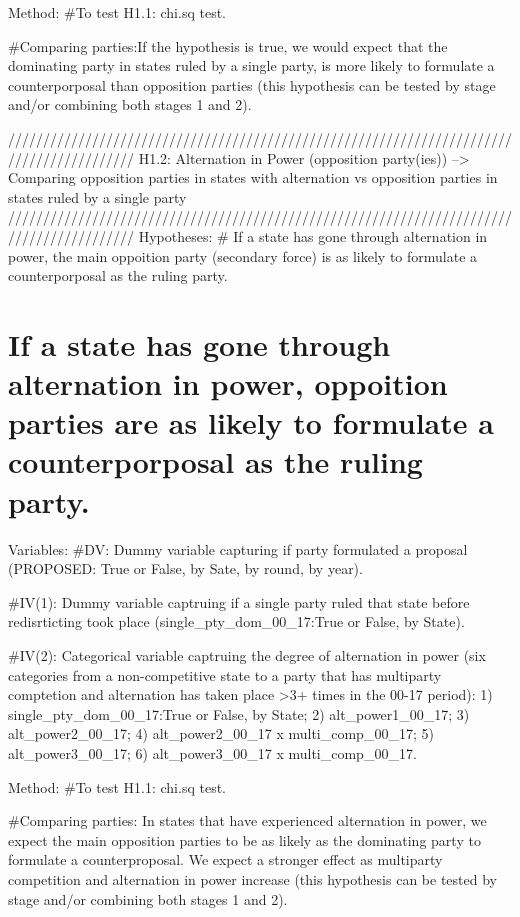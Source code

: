 \documentclass[
]{article}
\begin{document}
Method: \#To test H1.1: chi.sq test.

\#Comparing parties:If the hypothesis is true, we would expect that the
dominating party in states ruled by a single party, is more likely to
formulate a counterporposal than opposition parties (this hypothesis can
be tested by stage and/or combining both stages 1 and 2).

//////////////////////////////////////////////////////////////////////////////////////////
H1.2: Alternation in Power (opposition party(ies)) --\textgreater{}
Comparing opposition parties in states with alternation vs opposition
parties in states ruled by a single party
//////////////////////////////////////////////////////////////////////////////////////////
Hypotheses: \# If a state has gone through alternation in power, the
main oppoition party (secondary force) is as likely to formulate a
counterporposal as the ruling party.

\hypertarget{if-a-state-has-gone-through-alternation-in-power-oppoition-parties-are-as-likely-to-formulate-a-counterporposal-as-the-ruling-party.}{%
\section{If a state has gone through alternation in power, oppoition
parties are as likely to formulate a counterporposal as the ruling
party.}\label{if-a-state-has-gone-through-alternation-in-power-oppoition-parties-are-as-likely-to-formulate-a-counterporposal-as-the-ruling-party.}}

Variables: \#DV: Dummy variable capturing if party formulated a proposal
(PROPOSED: True or False, by Sate, by round, by year).

\#IV(1): Dummy variable captruing if a single party ruled that state
before redisrticting took place (single\_pty\_dom\_00\_17:True or False,
by State).

\#IV(2): Categorical variable captruing the degree of alternation in
power (six categories from a non-competitive state to a party that has
multiparty comptetion and alternation has taken place \textgreater3+
times in the 00-17 period): 1) single\_pty\_dom\_00\_17:True or False,
by State; 2) alt\_power1\_00\_17; 3) alt\_power2\_00\_17; 4)
alt\_power2\_00\_17 x multi\_comp\_00\_17; 5) alt\_power3\_00\_17; 6)
alt\_power3\_00\_17 x multi\_comp\_00\_17.

Method: \#To test H1.1: chi.sq test.

\#Comparing parties: In states that have experienced alternation in
power, we expect the main opposition parties to be as likely as the
dominating party to formulate a counterproposal. We expect a stronger
effect as multiparty competition and alternation in power increase (this
hypothesis can be tested by stage and/or combining both stages 1 and 2).
\end{document}
